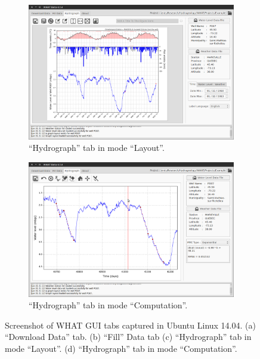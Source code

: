\documentclass[12pt, letterpaper, fleqn]{report}
\begin{document}
\begin{figure}[h!]
\begin{subfigure}[t]{0.45\textwidth}
                \includegraphics[width=\textwidth]{WHAT_Screenshot002}
                \caption{``Hydrograph'' tab in mode ``Layout''.}
                \label{subfig:ScnShot_002}
        \end{subfigure}
        \hspace{0.5cm}
        \begin{subfigure}[t]{0.45\textwidth}
                \includegraphics[width=\textwidth]{WHAT_Screenshot003}
                \caption{``Hydrograph'' tab in mode ``Computation''.}
                \label{subfig:ScnShot_003}
        \end{subfigure}
        \caption[Screenshots of WHAT GUI tabs captured in Ubuntu Linux 14.04.]{Screenshot of WHAT GUI tabs captured in Ubuntu Linux 14.04. (a) ``Download Data'' tab. (b) ``Fill'' Data tab (c) ``Hydrograph'' tab in mode ``Layout''. (d) ``Hydrograph'' tab in mode ``Computation''.}\label{fig:WHAT_GUI_ScnShot}
\end{figure}
\end{document}
